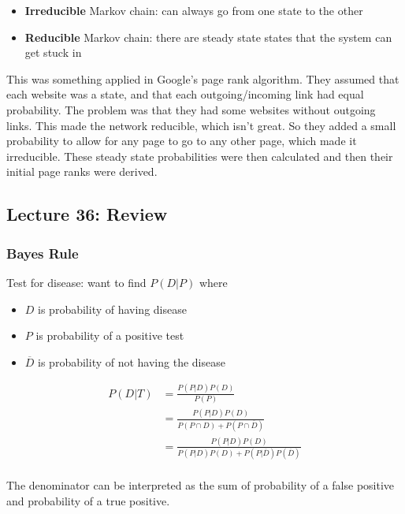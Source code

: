 \documentclass[10pt]{article}
\begin{document}
\begin{example}
	\begin{itemize}
		\item \textbf{Irreducible} Markov chain: can always go from one state to the other
		\item \textbf{Reducible} Markov chain: there are steady state states that the system can get stuck in
	\end{itemize}

	This was something applied in Google's page rank algorithm.
	They assumed that each website was a state, and that each outgoing/incoming link had equal probability.
	The problem was that they had some websites without outgoing links.
	This made the network reducible, which isn't great.
	So they added a small probability to allow for any page to go to any other page, which made it irreducible.  
	These steady state probabilities were then calculated and then their initial page ranks were derived.

\end{example}

\subsection{Lecture 36: Review}



\subsubsection{Bayes Rule}


\begin{example}
	Test for disease: want to find $ P(D|P) $ 
	where 
	\begin{itemize}
		\item $ D $ is probability of having disease
		\item $ P $ is probability of a positive test
		\item $ \overline{D} $ is probability of not having the disease
	\end{itemize}

\begin{equation}
	\begin{split}
		P(D|T) &= \frac{P(P|D)P(D)}{P(P)} \\
		 &= \frac{P(P|D)P(D)}{P(P\cap D) + P(P \cap \overline{D}) } \\
		 &=  \frac{P(P|D)P(D)}{P(P|D)P(D) + P(P|\overline{D})P(\overline{D})} \\
	\end{split}
\end{equation}

The denominator can be interpreted as the sum of probability of a false positive and probability of a true positive.

\end{example}
\end{document}
